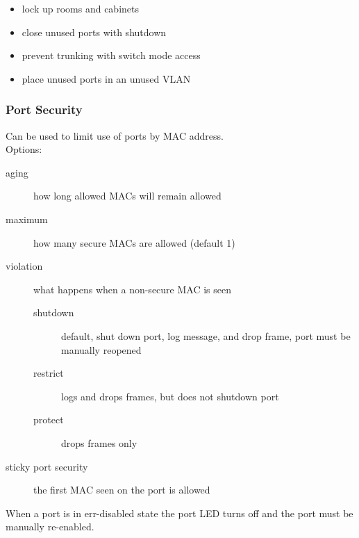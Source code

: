 \begin{itemize}

\item lock up rooms and cabinets
\item close unused ports with shutdown
\item prevent trunking with switch mode access
\item place unused ports in an unused VLAN

\end{itemize}

\subsubsection{Port Security}

Can be used to limit use of ports by MAC address.\\

Options:

\begin{description}

\item[aging]
how long allowed MACs will remain allowed

\item[maximum]
how many secure MACs are allowed (default 1)

\item[violation]
what happens when a non-secure MAC is seen

\begin{description}

\item[shutdown]
default, shut down port, log message, and drop frame, port must be manually
reopened

\item[restrict]
logs and drops frames, but does not shutdown port

\item[protect]
drops frames only

\end{description}

\end{description}

\begin{description}

\item[sticky port security]
the first MAC seen on the port is allowed

\end{description}

When a port is in err-disabled state the port LED turns off and the port
must be manually re-enabled.
